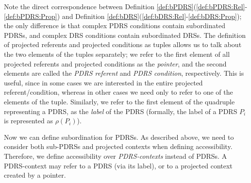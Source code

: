 \noindent Note the direct correspondence between Definition
\ref{def:bPDRS}(\ref{def:bPDRS:Rel}-\ref{def:bPDRS:Prop}) and Definition
\ref{def:bDRS}(\ref{def:bDRS:Rel}-\ref{def:bDRS:Prop}); the only difference
is that complex PDRS conditions contain subordinated PDRSs, and complex DRS
conditions contain subordinated DRSs.  The definition of projected referents
and projected conditions as tuples allows us to talk about the two elements
of the tuples separately; we refer to the first element of all projected
referents and projected conditions as the \textit{pointer}, and the second
elements are called the \textit{PDRS referent} and \textit{PDRS condition},
respectively. This is useful, since in some cases we are interested in the
entire projected referent/condition, whereas in other cases we need only to
refer to one of the elements of the tuple. Similarly, we refer to the first
element of the quadruple representing a PDRS, as the \textit{label} of the
PDRS (formally, the label of a PDRS $P_i$ is represented as $\rho(P_i)$).

Now we can define subordination for PDRSs. As described above, we need to
consider both sub-PDRSs and projected contexts when defining accessibility.
Therefore, we define accessibility over \textit{PDRS-contexts} instead of
PDRSs. A PDRS-context may refer to a PDRS (via its label), or to
a projected context created by a pointer.


